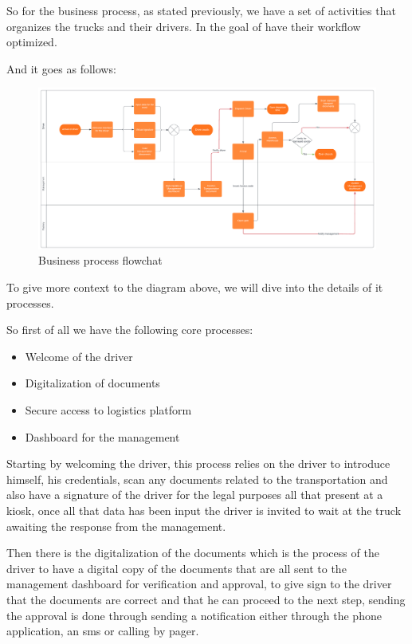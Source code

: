 So for the business process, as stated previously, we have a set of activities that organizes the trucks and their drivers.
In the goal of have their workflow optimized.

And it goes as follows:

\begin{figure}[!htpb]
    \centering
    \includegraphics[width=1\textwidth]{images/flowchart}
    \caption{\footnotesize{Business process flowchat}}
    \label{fig:flowchart}
\end{figure}

To give more context to the diagram above, we will dive into the details of it processes.

So first of all we have the following core processes:

\begin{itemize}
    \item Welcome of the driver
    \item Digitalization of documents
    \item Secure access to logistics platform
    \item Dashboard for the management
\end{itemize}

Starting by welcoming the driver, this process relies on the driver to introduce himself, his credentials,
scan any documents related to the transportation and also have a signature of the driver for the legal purposes
all that present at a kiosk, once all that data has been input the driver is invited to wait at the truck awaiting
the response from the management.

Then there is the digitalization of the documents which is the process of the driver to have a digital copy
of the documents that are all sent to the management dashboard for verification and approval, to give sign
to the driver that the documents are correct and that he can proceed to the next step, sending the approval
is done through sending a notification either through the phone application, an sms or calling by pager.

